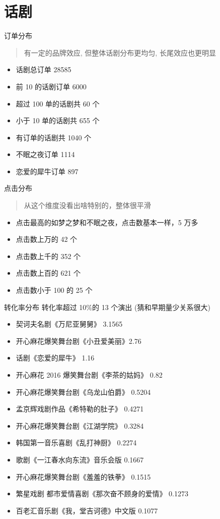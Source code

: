 \documentclass[presentation, bigger]{beamer}
\begin{document}
\section{话剧}
\label{sec:org317ff9c}
\begin{frame}[allowframebreaks,label=]{订单分布}
\begin{quote}
有一定的品牌效应, 但整体话剧分布更均匀, 长尾效应也更明显
\end{quote}
\begin{itemize}
\item 话剧总订单 28585
\item 前 10 的话剧订单 6000
\item 超过 100 单的话剧共 60 个
\item 小于 10 单的话剧共 655 个
\item 有订单的话剧共 1040 个
\item 不眠之夜订单 1114
\item 恋爱的犀牛订单 897
\end{itemize}
\end{frame}

\begin{frame}[allowframebreaks,label=]{点击分布}
\begin{quote}
从这个维度没看出啥特别的，整体很平滑
\end{quote}
\begin{itemize}
\item 点击最高的如梦之梦和不眠之夜，点击数基本一样，5 万多
\item 点击数上万的 42 个
\item 点击数上千的 352 个
\item 点击数上百的 621 个
\item 点击数小于 100 的 25 个
\end{itemize}
\end{frame}

\begin{frame}[label={sec:org3eb3c5c}]{转化率分布}
转化率超过 10\%的 13 个演出 (猜和早期量少关系很大)
\begin{itemize}
\item 契诃夫名剧《万尼亚舅舅》 3.1565
\item 开心麻花爆笑舞台剧《小丑爱美丽》2.76
\item 话剧《恋爱的犀牛》 1.16
\item 开心麻花 2016 爆笑舞台剧《李茶的姑妈》 0.82
\item 开心麻花爆笑舞台剧《乌龙山伯爵》 0.5204
\item 孟京辉戏剧作品《希特勒的肚子》 0.4271
\item 开心麻花爆笑舞台剧《江湖学院》 0.3284
\item 韩国第一音乐喜剧《乱打神厨》 0.2274
\item 歌剧《一江春水向东流》音乐会版 0.1667
\item 开心麻花爆笑舞台剧《羞羞的铁拳》 0.1515
\item 繁星戏剧 都市爱情喜剧《那次奋不顾身的爱情》 0.1273
\item 百老汇音乐剧《我，堂吉诃德》中文版 0.1077
\end{itemize}
\end{frame}
\end{document}
